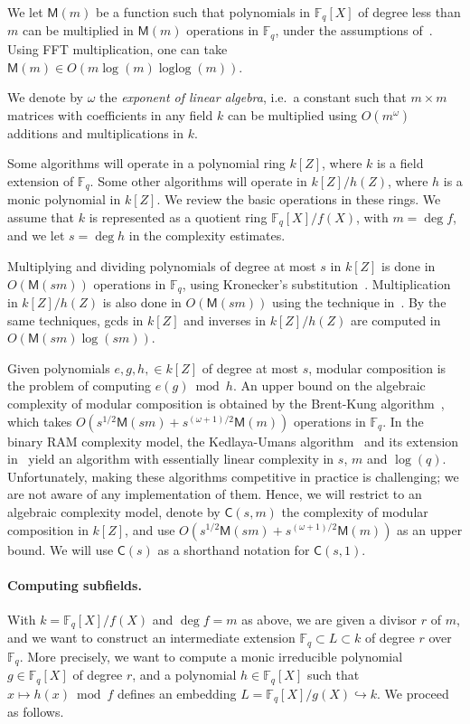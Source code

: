 \documentclass[12pt]{article}
\theoremstyle{plain}
\theoremstyle{definition}
\DeclareMathOperator{\loglog}{loglog}
\def\F{\ensuremath{\mathbb{F}}}
\def\MM{\ensuremath{\mathsf{M}}}
\def\CC{\ensuremath{\mathsf{C}}}
\newcounter{algorithm}
\begin{document}
We let $\MM(m)$ be a function such that polynomials in $\F_q[X]$ of
degree less than $m$ can be multiplied in $\MM(m)$ operations in
$\F_q$, under the assumptions of~\cite[Ch.~8.3]{vzGG}. Using FFT
multiplication, one can take $\MM(m)\in O(m\log (m) \loglog (m))$.

We denote by $\omega$ the \emph{exponent of linear algebra}, i.e.\ a
constant such that $m\times m$ matrices with coefficients in any field
$k$ can be multiplied using $O(m^\omega)$ additions and
multiplications in $k$.

Some algorithms will operate in a polynomial ring $k[Z]$, where $k$ is
a field extension of $\F_q$. Some other algorithms will operate in
$k[Z]/h(Z)$, where $h$ is a monic polynomial in $k[Z]$. We review the
basic operations in these rings. We assume that $k$ is represented as
a quotient ring $\F_q[X]/f(X)$, with $m=\deg f$, and we let $s=\deg h$
in the complexity estimates.

Multiplying and dividing polynomials of degree at most $s$ in $k[Z]$
is done in $O(\MM(sm))$ operations in $\F_q$, using Kronecker's
substitution~\cite{moenck76,kaltofen87,vzGG,vzgathen+shoup92,harvey09}.
Multiplication in $k[Z]/h(Z)$ is also done in $O(\MM(sm))$ using the
technique in~\cite{pascal+schost06}. By the same techniques, gcds in
$k[Z]$ and inverses in $k[Z]/h(Z)$ are computed in $O(\MM(sm)\log(sm))$.

Given polynomials $e,g,h,\in k[Z]$ of degree at most $s$, modular
composition is the problem of computing $e(g) \bmod h$. An upper bound
on the algebraic complexity of modular composition is obtained by the
Brent-Kung algorithm~\cite{brent+kung}, which takes
$O(s^{1/2}\MM(sm) + s^{(\omega+1)/2}\MM(m))$ operations in $\F_q$.  In
the binary RAM complexity model, the Kedlaya-Umans
algorithm~\cite{KeUm11} and its extension in~\cite{PoSc13a} yield an
algorithm with essentially linear complexity in $s$, $m$ and
$\log(q)$. Unfortunately, making these algorithms competitive in
practice is challenging; we are not aware of any implementation of
them. Hence, we will restrict to an algebraic complexity model, denote
by $\CC(s,m)$ the complexity of modular composition in $k[Z]$, and use
$O(s^{1/2}\MM(sm) + s^{(\omega+1)/2}\MM(m))$ as an upper bound.  We
will use $\CC(s)$ as a shorthand notation for $\CC(s,1)$.


\paragraph{Computing subfields.}
With $k = \F_q[X]/f(X)$ and $\deg f=m$ as above, we are given a
divisor $r$ of $m$, and we want to construct an intermediate extension
$\F_q \subset L \subset k$ of degree $r$ over $\F_q$. More precisely,
we want to compute a monic irreducible polynomial $g \in \F_q[X]$ of
degree $r$, and a polynomial $h \in \F_q[X]$ such that
$x \mapsto h(x)\bmod f$ defines an embedding
$L = \F_q[X] / g(X) \hookrightarrow k$. We proceed as follows.
\end{document}
